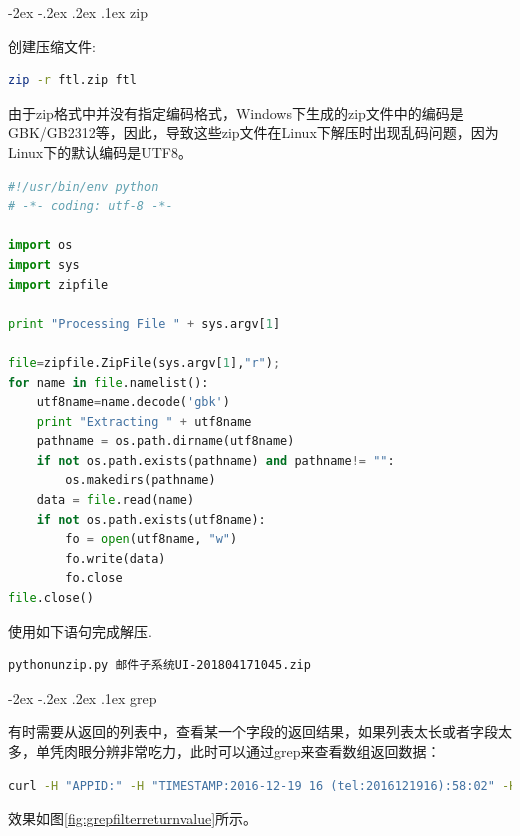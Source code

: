 \documentclass[12pt]{book}
\makeatletter
\numberwithin{dummy}{section}
\theoremstyle{ocrenumbox}
\theoremstyle{blacknumex}
\theoremstyle{blacknumbox}
\theoremstyle{ocrenum}
\renewcommand\paragraph{\@startsection{paragraph}{4}{\z@}
	{-2ex \@plus-.2ex \@minus .2ex}
	{.1ex}
	{\normalfont\small\sffamily\bfseries}}
\makeatother
\begin{document}
\paragraph{zip}

创建压缩文件:

\begin{lstlisting}[language=Bash]
zip -r ftl.zip ftl
\end{lstlisting}

由于zip格式中并没有指定编码格式，Windows下生成的zip文件中的编码是GBK/GB2312等，因此，导致这些zip文件在Linux下解压时出现乱码问题，因为Linux下的默认编码是UTF8。


\begin{lstlisting}[language=Python]
#!/usr/bin/env python
# -*- coding: utf-8 -*-

import os
import sys
import zipfile

print "Processing File " + sys.argv[1]

file=zipfile.ZipFile(sys.argv[1],"r");
for name in file.namelist():
	utf8name=name.decode('gbk')
	print "Extracting " + utf8name
	pathname = os.path.dirname(utf8name)
	if not os.path.exists(pathname) and pathname!= "":
		os.makedirs(pathname)
	data = file.read(name)
	if not os.path.exists(utf8name):
		fo = open(utf8name, "w")
		fo.write(data)
		fo.close
file.close()
\end{lstlisting}

使用如下语句完成解压.

\begin{lstlisting}[language=Bash]
pythonunzip.py 邮件子系统UI-201804171045.zip
\end{lstlisting}

\paragraph{grep}

有时需要从返回的列表中，查看某一个字段的返回结果，如果列表太长或者字段太多，单凭肉眼分辨非常吃力，此时可以通过grep来查看数组返回数据：

\begin{lstlisting}[language=Bash]
curl -H "APPID:" -H "TIMESTAMP:2016-12-19 16 (tel:2016121916):58:02" -H "ECHOSTR:" -H "TOKEN:" http://10.10.1.12:28080/api/xzxk?xdr= | jq '.' |grep jdrq
\end{lstlisting}

效果如图\ref{fig:grepfilterreturnvalue}所示。
\end{document}
